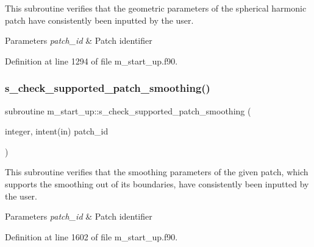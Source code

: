 This subroutine verifies that the geometric parameters of the spherical harmonic patch have consistently been inputted by the user. 


\begin{DoxyParams}{Parameters}
{\em patch\+\_\+id} & Patch identifier \\
\hline
\end{DoxyParams}


Definition at line 1294 of file m\+\_\+start\+\_\+up.\+f90.

\mbox{\label{namespacem__start__up_a06fc233527470088dcf63425fc758b8c}} 
\subsubsection{\texorpdfstring{s\+\_\+check\+\_\+supported\+\_\+patch\+\_\+smoothing()}{s\_check\_supported\_patch\_smoothing()}}
{\footnotesize\ttfamily subroutine m\+\_\+start\+\_\+up\+::s\+\_\+check\+\_\+supported\+\_\+patch\+\_\+smoothing (\begin{DoxyParamCaption}\item[{integer, intent(in)}]{patch\+\_\+id }\end{DoxyParamCaption})}



This subroutine verifies that the smoothing parameters of the given patch, which supports the smoothing out of its boundaries, have consistently been inputted by the user. 


\begin{DoxyParams}{Parameters}
{\em patch\+\_\+id} & Patch identifier \\
\hline
\end{DoxyParams}


Definition at line 1602 of file m\+\_\+start\+\_\+up.\+f90.

\mbox{\label{namespacem__start__up_a9ec1a8955422d87dddd1ad55f99fb9b8}} 
